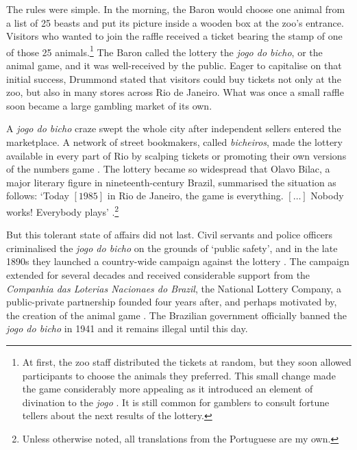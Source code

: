 \documentclass[a4paper,12pt]{article}
\begin{document}
The rules were simple. In the morning, the Baron would choose one animal from a list of 25 beasts and put its picture inside a wooden box at the zoo's entrance. Visitors who wanted to join the raffle received a ticket bearing the stamp of one of those 25 animals.\footnote{At first, the zoo staff distributed the tickets at random, but they soon allowed participants to choose the animals they preferred. This small change made the game considerably more appealing as it introduced an element of divination to the \textit{jogo} \citep[71--74]{da1999aguias}. It is still common for gamblers to consult fortune tellers about the next results of the lottery.} The Baron called the lottery the \textit{jogo do bicho}, or the animal game, and it was well-received by the public. Eager to capitalise on that initial success, Drummond stated that visitors could buy tickets not only at the zoo, but also in many stores across Rio de Janeiro. What was once a small raffle soon became a large gambling market of its own. 

A \textit{jogo do bicho} craze swept the whole city after independent sellers entered the marketplace. A network of street bookmakers, called \textit{bicheiros}, made the lottery available in every part of Rio by scalping tickets or promoting their own versions of the numbers game \citep[37]{chazkel2011laws}. The lottery became so widespread that Olavo Bilac, a major literary figure in nineteenth-century Brazil, summarised the situation as follows: `Today $[1985]$ in Rio de Janeiro, the game is everything. $[\dots]$  Nobody works! Everybody plays' \citep[43]{pacheco1957antologia}.\footnote{Unless otherwise noted, all translations from the Portuguese are my own.} 

But this tolerant state of affairs did not last. Civil servants and police officers criminalised the \textit{jogo do bicho} on the grounds of `public safety', and in the late 1890s they launched a country-wide campaign against the lottery \citep{benatte2002jogos}. The campaign extended for several decades and received considerable support from the \textit{Companhia das Loterias Nacionaes do Brazil}, the National Lottery Company, a public-private partnership founded four years after, and perhaps motivated by, the creation of the animal game \citep[82]{da1999aguias}. The Brazilian government officially banned the \textit{jogo do bicho} in 1941 and it remains illegal until this day.  
 
\end{document}

